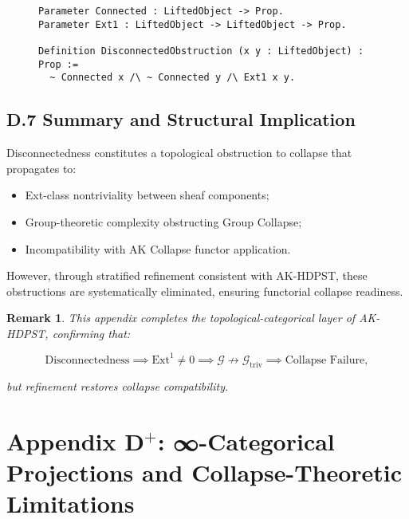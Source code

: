 \documentclass[11pt]{article}
\newtheorem{remark}[theorem]{Remark}
\begin{document}
\begin{figure}[h]
\centering
\begin{lstlisting}[language=Coq, caption=Disconnectedness Obstruction Predicate]
Parameter Connected : LiftedObject -> Prop.
Parameter Ext1 : LiftedObject -> LiftedObject -> Prop.

Definition DisconnectedObstruction (x y : LiftedObject) : Prop :=
  ~ Connected x /\ ~ Connected y /\ Ext1 x y.
\end{lstlisting}
\end{figure}

\subsection*{D.7 Summary and Structural Implication}

Disconnectedness constitutes a topological obstruction to collapse that propagates to:

\begin{itemize}
    \item Ext-class nontriviality between sheaf components;
    \item Group-theoretic complexity obstructing Group Collapse;
    \item Incompatibility with AK Collapse functor application.
\end{itemize}

However, through stratified refinement consistent with AK-HDPST, these obstructions are systematically eliminated, ensuring functorial collapse readiness.

\begin{remark}
This appendix completes the topological-categorical layer of AK-HDPST, confirming that:

\[
\text{Disconnectedness} \implies \mathrm{Ext}^1 \neq 0 \implies \mathcal{G} \not\rightarrow \mathcal{G}_{\mathrm{triv}} \implies \text{Collapse Failure},
\]

but refinement restores collapse compatibility.

\end{remark}




\section*{Appendix D$^{+}$: ∞-Categorical Projections and Collapse-Theoretic Limitations}
\end{document}
